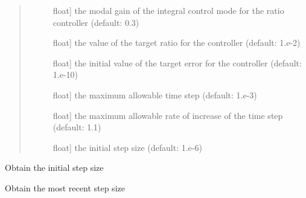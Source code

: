 \documentclass[letterpaper,10pt,english]{sphinxmanual}
\begin{document}
\begin{fulllineitems}
\begin{quote}
\begin{description}
\begin{description}
\item[{}] \leavevmode{[}float{]}
the modal gain of the integral control mode for the ratio controller (default: 0.3)

\item[{}] \leavevmode{[}float{]}
the value of the target ratio for the controller (default: 1.e-2)

\item[{}] \leavevmode{[}float{]}
the initial value of the target error for the controller (default: 1.e-10)

\item[{}] \leavevmode{[}float{]}
the maximum allowable time step (default: 1.e-3)

\item[{}] \leavevmode{[}float{]}
the maximum allowable rate of increase of the time step (default: 1.1)

\item[{}] \leavevmode{[}float{]}
the initial step size (default: 1.e-6)

\end{description}

\end{description}\end{quote}

\begin{fulllineitems}
\label{\detokenize{spitfire.time.stepcontrol:spitfire.time.stepcontrol.CascadeController.first_step_size}}
Obtain the initial step size

\end{fulllineitems}


\begin{fulllineitems}
\label{\detokenize{spitfire.time.stepcontrol:spitfire.time.stepcontrol.CascadeController.last_step_size}}
Obtain the most recent step size


\end{fulllineitems}
\end{fulllineitems}
\end{document}
